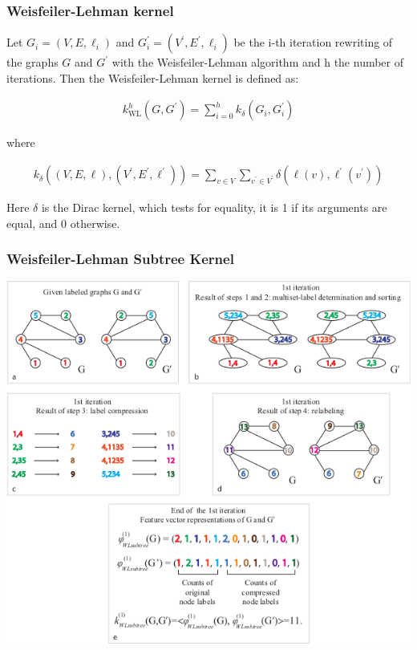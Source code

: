 \documentclass{beamer}
\begin{document}

\begingroup
\small
\begin{frame}
\frametitle{Weisfeiler-Lehman kernel}

\begin{definition}
Let $G_i = (V, E, \ell_i)$ and $G_i^\prime = (V^\prime , E^\prime , \ell_i)$ be the i-th iteration rewriting of the graphs $G$ and $G^\prime$ with the Weisfeiler-Lehman algorithm and h the number of iterations. Then the Weisfeiler-Lehman kernel is defined as:

\begin{align}
k_{\mathrm{WL}}^{h}\left(G, G^\prime\right)=\sum_{i=0}^h k_\delta\left(G_i, G_i^\prime\right)
\end{align}

where

\begin{align}
k_\delta\left((V, E, \ell),\left(V^\prime, E^\prime, \ell^\prime\right)\right)=\sum_{v \in V} \sum_{v^{\prime} \in V^{\prime}} \delta\left(\ell(v), \ell^{\prime}\left(v^{\prime}\right)\right)
\end{align}

Here $\delta$ is the Dirac kernel, which tests for equality, it is 1 if its arguments are equal, and 0 otherwise.
\end{definition}

\end{frame}
\endgroup


\begin{frame}
\frametitle{Weisfeiler-Lehman Subtree Kernel}

\begin{center}
\begin{figure}
\end{figure}
\includegraphics[width=\textwidth,height=0.8\textheight,keepaspectratio]{img/wl_iteration_total.png}
\end{center}

\end{frame}
\end{document}
